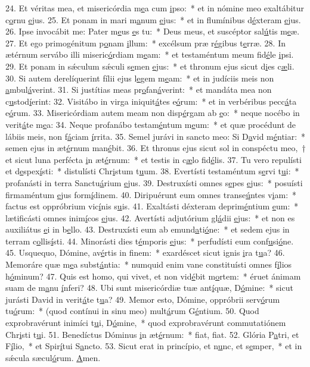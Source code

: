 24. Et véritas mea, et misericórdia m\uline{e}a cum \uline{i}pso:~* et in nómine meo exaltábitur c\uline{o}rnu \uline{e}jus.
25. Et ponam in mari m\uline{a}num \uline{e}jus:~* et in flumínibus d\uline{é}xteram \uline{e}jus.
26. Ipse invocábit me: Pater m\uline{e}us \uline{e}s tu:~* Deus meus, et suscéptor sal\uline{ú}tis m\uline{e}æ.
27. Et ego primogénitum p\uline{o}nam \uline{i}llum:~* excélsum præ r\uline{é}gibus t\uline{e}rræ.
28. In ætérnum servábo illi miseric\uline{ó}rdiam m\uline{e}am:~* et testaméntum meum fid\uline{é}le \uline{i}psi.
29. Et ponam in sǽculum sǽculi s\uline{e}men \uline{e}jus:~* et thronum ejus sicut d\uline{i}es c\uline{æ}li.
30. Si autem derelíquerint fílii ejus l\uline{e}gem m\uline{e}am:~* et in judíciis meis non \uline{a}mbul\uline{á}verint.
31. Si justítias meas pr\uline{o}fan\uline{á}verint:~* et mandáta mea non c\uline{u}stod\uline{í}erint:
32. Visitábo in virga iniquit\uline{á}tes e\uline{ó}rum:~* et in verbéribus pecc\uline{á}ta e\uline{ó}rum.
33. Misericórdiam autem meam non disp\uline{é}rgam ab \uline{e}o:~* neque nocébo in verit\uline{á}te m\uline{e}a:
34. Neque profanábo testam\uline{é}ntum m\uline{e}um:~* et quæ procédunt de lábiis meis, non f\uline{á}ciam \uline{í}rrita.
35. Semel jurávi in sancto meo: Si D\uline{a}vid m\uline{é}ntiar:~* semen ejus in æt\uline{é}rnum man\uline{é}bit.
36. Et thronus ejus sicut sol in conspéctu meo,~† et sicut luna perfécta \uline{i}n æt\uline{é}rnum:~* et testis in c\uline{æ}lo fid\uline{é}lis.
37. Tu vero repulísti et d\uline{e}spex\uline{í}sti:~* distulísti Chr\uline{i}stum t\uline{u}um.
38. Evertísti testaméntum s\uline{e}rvi t\uline{u}i:~* profanásti in terra Sanctu\uline{á}rium \uline{e}jus.
39. Destruxísti omnes s\uline{e}pes \uline{e}jus:~* posuísti firmaméntum \uline{e}jus form\uline{í}dinem.
40. Diripuérunt eum omnes transe\uline{ú}ntes v\uline{i}am:~* factus est oppróbrium vic\uline{í}nis s\uline{u}is.
41. Exaltásti déxteram deprim\uline{é}ntium \uline{e}um:~* lætificásti omnes inim\uline{í}cos \uline{e}jus.
42. Avertísti adjutórium gl\uline{á}dii \uline{e}jus:~* et non es auxiliátus \uline{e}i in b\uline{e}llo.
43. Destruxísti eum ab emund\uline{a}ti\uline{ó}ne:~* et sedem ejus in terram c\uline{o}llis\uline{í}sti.
44. Minorásti dies t\uline{é}mporis \uline{e}jus:~* perfudísti eum conf\uline{u}si\uline{ó}ne.
45. Usquequo, Dómine, av\uline{é}rtis in f\uline{i}nem:~* exardéscet sicut ignis \uline{i}ra t\uline{u}a?
46. Memoráre quæ m\uline{e}a subst\uline{á}ntia:~* numquid enim vane constituísti omnes f\uline{í}lios h\uline{ó}minum?
47. Quis est homo, qui vivet, et non vid\uline{é}bit m\uline{o}rtem:~* éruet ánimam suam de m\uline{a}nu \uline{í}nferi?
48. Ubi sunt misericórdiæ tuæ ant\uline{í}quæ, D\uline{ó}mine:~* sicut jurásti David in verit\uline{á}te t\uline{u}a?
49. Memor esto, Dómine, oppróbrii serv\uline{ó}rum tu\uline{ó}rum:~* (quod contínui in sinu meo) mult\uline{á}rum G\uline{é}ntium.
50. Quod exprobravérunt inimíci t\uline{u}i, D\uline{ó}mine,~* quod exprobravérunt commutatiónem Chr\uline{i}sti t\uline{u}i.
51. Benedíctus Dóminus \uline{i}n æt\uline{é}rnum:~* f\uline{i}at, f\uline{i}at.
52. Glória P\uline{a}tri, et F\uline{í}lio,~* et Spir\uline{í}tui S\uline{a}ncto.
53. Sicut erat in princípio, et n\uline{u}nc, et s\uline{e}mper,~* et in sǽcula sæcul\uline{ó}rum. \uline{A}men.

